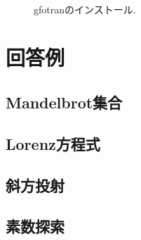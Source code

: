 \documentclass[a4j]{jsbook}
\begin{document}
\begin{figure}[ht]
\\
\caption{gfotranのインストール.  }
\label{fig_install}
\end{figure}

\clearpage

\chapter{回答例}

\section{Mandelbrot集合}


\section{Lorenz方程式}


\section{斜方投射}


\section{素数探索}


\end{document}
